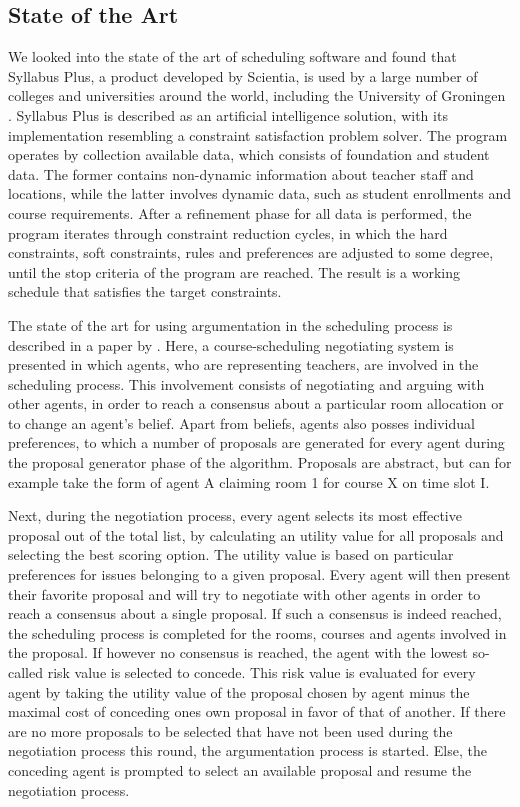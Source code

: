 \subsection{State of the Art}
We looked into the state of the art of scheduling software and found that 
Syllabus Plus, a product developed by Scientia, is used by a large number 
of colleges and universities around the world, including the University of 
Groningen \cite{SyllabusPlus}. Syllabus Plus is described as an artificial 
intelligence solution, with its implementation resembling a constraint 
satisfaction problem solver. The program operates by collection available 
data, which consists of foundation and student data. The former contains 
non-dynamic information about teacher staff and locations, while the latter 
involves dynamic data, such as student enrollments and course requirements. 
After a refinement phase for all data is performed, the program iterates 
through constraint reduction cycles, in which the hard constraints, soft 
constraints, rules and preferences are adjusted to some degree, until the 
stop criteria of the program are reached. The result is a working schedule 
that satisfies the target constraints.

The state of the art for using argumentation in the scheduling process is 
described in a paper by \cite{Kuo:jc}. Here, a course-scheduling 
negotiating system is presented in which agents, who are representing 
teachers, are involved in the scheduling process. This involvement consists 
of negotiating and arguing with other agents, in order to reach a consensus 
about a particular room allocation or to change an agent's belief. Apart 
from beliefs, agents also posses individual preferences, to which a number 
of proposals are generated for every agent during the proposal generator 
phase of the algorithm. Proposals are abstract, but can for example take 
the form of agent A claiming room 1 for course X on time slot I. 

Next, during the negotiation process, every agent selects its most 
effective proposal out of the total list, by calculating an utility value 
for all proposals and selecting the best scoring option. The utility value 
is based on particular preferences for issues belonging to a given 
proposal. Every agent will then present their favorite proposal and will 
try to negotiate with other agents in order to reach a consensus about a 
single proposal. If such a consensus is indeed reached, the scheduling 
process is completed for the rooms, courses and agents involved in the 
proposal. If however no consensus is reached, the agent with the lowest so-
called risk value is selected to concede. This risk value is evaluated for 
every agent by taking the utility value of the proposal chosen by agent 
minus the maximal cost of conceding ones own proposal in favor of that of 
another. If there are no more proposals to be selected that have not been 
used during the negotiation process this round, the argumentation process 
is started. Else, the conceding agent is prompted to select an available 
proposal and resume the negotiation process. 

